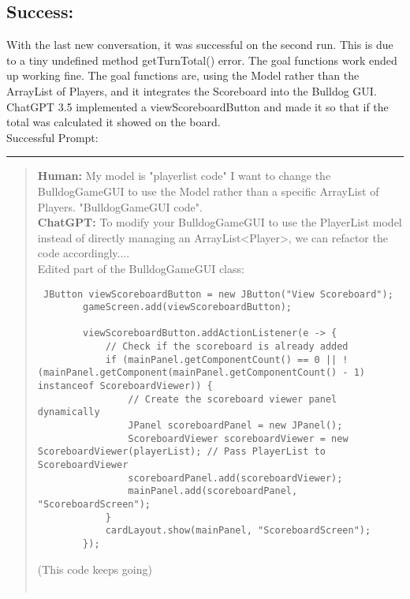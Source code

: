 \documentclass[a4paper,11pt]{article}
\begin{document}
\subsection*{Success:}
With the last new conversation, it was successful on the second run. This is due to a tiny undefined method getTurnTotal() error. The goal functions work ended up working fine. The goal functions are, using the Model rather than the ArrayList of Players, and it integrates the Scoreboard into the Bulldog GUI. \\
ChatGPT 3.5 implemented a viewScoreboardButton and made it so that if the total was calculated it showed on the board. \\
Successful Prompt:
\hrule
\vspace{4pt} %
\begin{quote}
\textbf{Human:} My model is "playerlist code" I want to change the BulldogGameGUI to use the Model rather than a specific ArrayList of Players. "BulldogGameGUI code". \\
\textbf{ChatGPT:} To modify your BulldogGameGUI to use the PlayerList model instead of directly managing an ArrayList<Player>, we can refactor the code accordingly.... \\
Edited part of the BulldogGameGUI class:
\begin{lstlisting}
 JButton viewScoreboardButton = new JButton("View Scoreboard");
        gameScreen.add(viewScoreboardButton);

        viewScoreboardButton.addActionListener(e -> {
            // Check if the scoreboard is already added
            if (mainPanel.getComponentCount() == 0 || !(mainPanel.getComponent(mainPanel.getComponentCount() - 1) instanceof ScoreboardViewer)) {
                // Create the scoreboard viewer panel dynamically
                JPanel scoreboardPanel = new JPanel();
                ScoreboardViewer scoreboardViewer = new ScoreboardViewer(playerList); // Pass PlayerList to ScoreboardViewer
                scoreboardPanel.add(scoreboardViewer);
                mainPanel.add(scoreboardPanel, "ScoreboardScreen");
            }
            cardLayout.show(mainPanel, "ScoreboardScreen");
        });
\end{lstlisting} (This code keeps going)\\\\
\end{quote}
\end{document}
